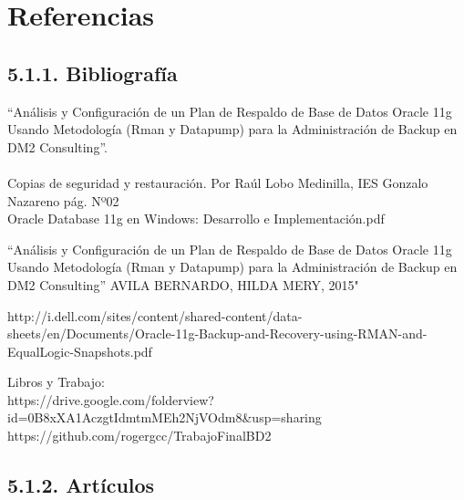 \documentclass[12pt,letterpaper]{article}
\begin{document}
\newpage
\section{Referencias}
\subsection{5.1.1. Bibliografía}
\begin{enumerate}
\bf{}
\end{enumerate}
\begin{enumerate}
``Análisis y Configuración de un Plan de Respaldo de Base de Datos Oracle 11g Usando Metodología (Rman y Datapump) para la Administración de Backup en DM2 Consulting”. \\
\\
Copias de seguridad y restauración. Por Raúl Lobo Medinilla, IES Gonzalo Nazareno
pág. Nº02 \\
Oracle Database 11g en Windows: Desarrollo e Implementación.pdf
\\

\end{enumerate}
\begin{enumerate}
\bf{}
\end{enumerate}
\begin{enumerate}
``Análisis y Configuración de un Plan de Respaldo de Base de Datos Oracle 11g Usando Metodología (Rman y Datapump) para la Administración de Backup en DM2 Consulting” AVILA BERNARDO, HILDA MERY, 2015" \\
\end{enumerate}

\begin{enumerate}
http://i.dell.com/sites/content/shared-content/data-sheets/en/Documents/Oracle-11g-Backup-and-Recovery-using-RMAN-and-EqualLogic-Snapshots.pdf
\end{enumerate}
\begin{enumerate}
Libros y Trabajo: \\
https://drive.google.com/folderview?id=0B8xXA1AczgtIdmtmMEh2NjVOdm8&usp=sharing \\
https://github.com/rogergcc/TrabajoFinalBD2
\end{enumerate}

\subsection{5.1.2. Artículos}
\end{document}
